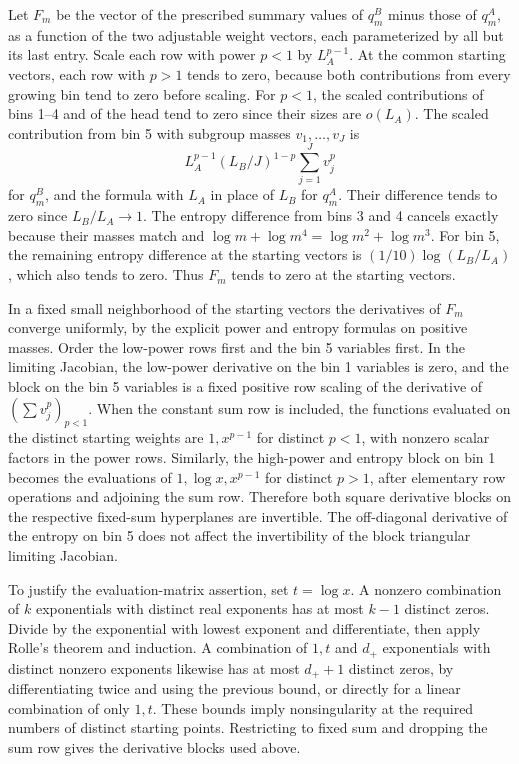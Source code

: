 \documentclass[11pt]{article}
\begin{document}
Let \(F_m\) be the vector of the prescribed summary values of \(q_m^B\) minus those of \(q_m^A\), as a function of the two adjustable weight vectors, each parameterized by all but its last entry. Scale each row with power \(p<1\) by \(L_A^{p-1}\). At the common starting vectors, each row with \(p>1\) tends to zero, because both contributions from every growing bin tend to zero before scaling. For \(p<1\), the scaled contributions of bins 1--4 and of the head tend to zero since their sizes are \(o(L_A)\). The scaled contribution from bin 5 with subgroup masses \(v_1,\dots,v_J\) is
\[
  L_A^{p-1}(L_B/J)^{1-p}\sum_{j=1}^J v_j^p
\]
for \(q_m^B\), and the formula with \(L_A\) in place of \(L_B\) for \(q_m^A\). Their difference tends to zero since \(L_B/L_A\to1\). The entropy difference from bins 3 and 4 cancels exactly because their masses match and \(\log m+\log m^4=\log m^2+\log m^3\). For bin 5, the remaining entropy difference at the starting vectors is \((1/10)\log(L_B/L_A)\), which also tends to zero. Thus \(F_m\) tends to zero at the starting vectors.

In a fixed small neighborhood of the starting vectors the derivatives of \(F_m\) converge uniformly, by the explicit power and entropy formulas on positive masses. Order the low-power rows first and the bin 5 variables first. In the limiting Jacobian, the low-power derivative on the bin 1 variables is zero, and the block on the bin 5 variables is a fixed positive row scaling of the derivative of \((\sum v_j^p)_{p<1}\). When the constant sum row is included, the functions evaluated on the distinct starting weights are \(1,x^{p-1}\) for distinct \(p<1\), with nonzero scalar factors in the power rows. Similarly, the high-power and entropy block on bin 1 becomes the evaluations of \(1,\log x,x^{p-1}\) for distinct \(p>1\), after elementary row operations and adjoining the sum row. Therefore both square derivative blocks on the respective fixed-sum hyperplanes are invertible. The off-diagonal derivative of the entropy on bin 5 does not affect the invertibility of the block triangular limiting Jacobian.

To justify the evaluation-matrix assertion, set \(t=\log x\). A nonzero combination of \(k\) exponentials with distinct real exponents has at most \(k-1\) distinct zeros. Divide by the exponential with lowest exponent and differentiate, then apply Rolle's theorem and induction. A combination of \(1,t\) and \(d_+\) exponentials with distinct nonzero exponents likewise has at most \(d_++1\) distinct zeros, by differentiating twice and using the previous bound, or directly for a linear combination of only \(1,t\). These bounds imply nonsingularity at the required numbers of distinct starting points. Restricting to fixed sum and dropping the sum row gives the derivative blocks used above.
\end{document}
